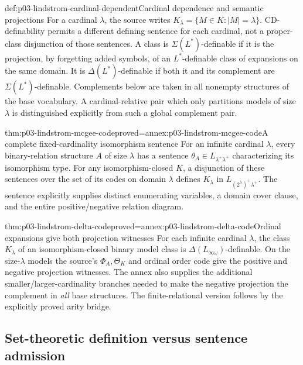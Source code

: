 \begin{hbdefinition}{def:p03-lindstrom-cardinal-dependent}{Cardinal dependence and semantic projections}
For a cardinal \(\lambda\), the source writes
\(K_\lambda=\{M\in K:|M|=\lambda\}\).
CD-definability permits a different defining sentence for each cardinal,
not a proper-class disjunction of those sentences. A class is
\(\Sigma(L^*)\)-definable if it is the projection, by forgetting added
symbols, of an \(L^*\)-definable class of expansions on the same domain.
It is \(\Delta(L^*)\)-definable if both it and its complement are
\(\Sigma(L^*)\)-definable. Complements below are taken in all nonempty
structures of the base vocabulary. A cardinal-relative pair which only
partitions models of size \(\lambda\) is distinguished explicitly from
such a global complement pair.
\end{hbdefinition}

\begin{hbtheorem}{thm:p03-lindstrom-mcgee-code}{proved=annex:p03-lindstrom-mcgee-code}{A complete fixed-cardinality isomorphism sentence}
For an infinite cardinal \(\lambda\), every binary-relation structure
\(A\) of size \(\lambda\) has a sentence
\(\theta_A\in L_{\lambda^+\lambda^+}\) characterizing its isomorphism
type. For any isomorphism-closed \(K\), a disjunction of these sentences
over the set of its codes on domain \(\lambda\) defines \(K_\lambda\)
in \(L_{(2^\lambda)^+\lambda^+}\).
The sentence explicitly supplies distinct enumerating variables, a domain
cover clause, and the entire positive/negative relation diagram.
\end{hbtheorem}

\begin{hbtheorem}{thm:p03-lindstrom-delta-code}{proved=annex:p03-lindstrom-delta-code}{Ordinal expansions give both projection witnesses}
For each infinite cardinal \(\lambda\), the class \(K_\lambda\)
of an isomorphism-closed binary model class is
\(\Delta(L_{\infty\omega})\)-definable. On the size-\(\lambda\)
models the source's \(\Phi_A,\Theta_K\) and ordinal order code give
the positive and negative projection witnesses. The annex also supplies
the additional smaller/larger-cardinality branches needed to make the
negative projection the complement in \emph{all} base structures.
The finite-relational version follows by the explicitly proved arity bridge.
\end{hbtheorem}

\subsection{Set-theoretic definition versus sentence admission}

